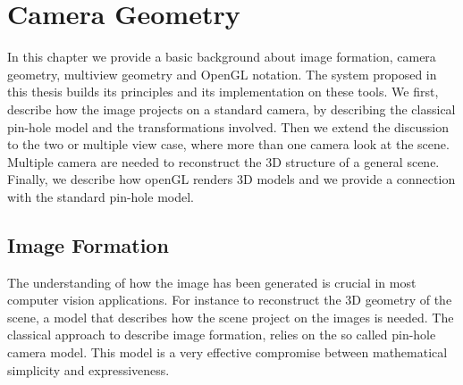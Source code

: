 \chapter{Camera Geometry}
\label{ch:camera}
In this chapter we provide a basic background about image formation, camera geometry, multiview geometry and OpenGL notation. 
The system proposed in this thesis builds its principles and its implementation on these tools. 
We first, describe how the image projects on a standard camera, by describing the classical pin-hole model and the transformations involved. 
Then we extend the discussion to the two or multiple view case, where more than one camera look at the scene. Multiple camera are needed to reconstruct the 3D structure of a general scene.
Finally, we describe how openGL renders 3D models and we provide a connection with the standard pin-hole model.


\minitoc
\newpage

\section{Image Formation}
The understanding of how the image has been generated is crucial in most computer vision applications. For instance to reconstruct the 3D geometry of the scene, a model that describes how the scene project on the images is needed. 
The classical approach to describe image formation, relies on the so called pin-hole camera model.
This model is a very effective compromise between mathematical simplicity and expressiveness.

